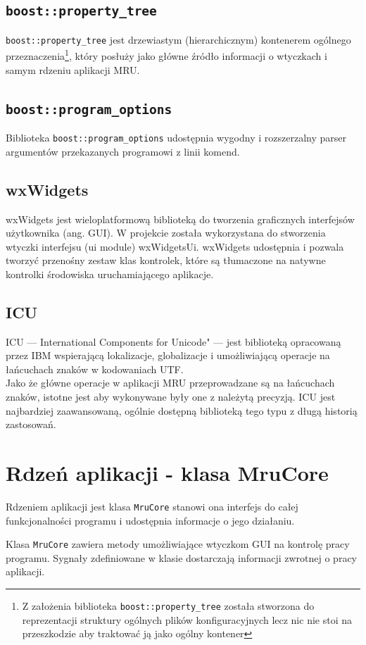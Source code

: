 \subsection{\texttt{boost::property\_tree}}
\par
\texttt{boost::property\_tree} jest drzewiastym (hierarchicznym) kontenerem ogólnego przeznaczenia\footnote{Z założenia biblioteka \texttt{boost::property\_tree} została stworzona do reprezentacji struktury ogólnych plików konfiguracyjnych lecz nic nie stoi na przeszkodzie aby traktować ją jako ogólny kontener}, który posłuży jako główne źródło informacji o wtyczkach i samym rdzeniu aplikacji MRU.

\subsection{\texttt{boost::program\_options}}
\par
Biblioteka \texttt{boost::program\_options} udostępnia wygodny i rozszerzalny parser argumentów przekazanych programowi z linii komend.

\subsection{wxWidgets}
wxWidgets jest wieloplatformową biblioteką do tworzenia graficznych interfejsów użytkownika (ang. GUI). W projekcie została wykorzystana do stworzenia wtyczki interfejsu (ui module) wxWidgetsUi. wxWidgets udostępnia i pozwala tworzyć przenośny zestaw klas kontrolek, które są tłumaczone na natywne kontrolki środowiska uruchamiającego aplikacje.

\subsection{ICU}
ICU --- International Components for Unicode" --- jest biblioteką opracowaną przez IBM wspierającą lokalizacje, globalizacje i umożliwiającą operacje na łańcuchach znaków w kodowaniach UTF.\\
Jako że główne operacje w aplikacji MRU przeprowadzane są na łańcuchach znaków, istotne jest aby wykonywane były one z należytą precyzją. ICU jest najbardziej zaawansowaną, ogólnie dostępną biblioteką tego typu z długą historią zastosowań.

\section{Rdzeń aplikacji - klasa MruCore}
Rdzeniem aplikacji jest klasa \texttt{MruCore} stanowi ona interfejs do całej funkcjonalności programu i udostępnia informacje o jego działaniu.
\par
Klasa \texttt{MruCore} zawiera metody umożliwiające wtyczkom GUI na kontrolę pracy programu. Sygnały zdefiniowane w klasie dostarczają informacji zwrotnej o pracy aplikacji.

